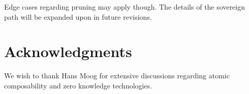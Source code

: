 \documentclass[onecolumn, 9pt, a4paper]{extarticle}
\begin{document}
Edge cases regarding pruning may apply though. The details of the sovereign path will be expanded upon in future revisions.



\section*{Acknowledgments}
 We wish to thank Hans Moog for extensive discussions regarding atomic composability and zero knowledge technologies.

\appendix



    
    
    


\end{document}
